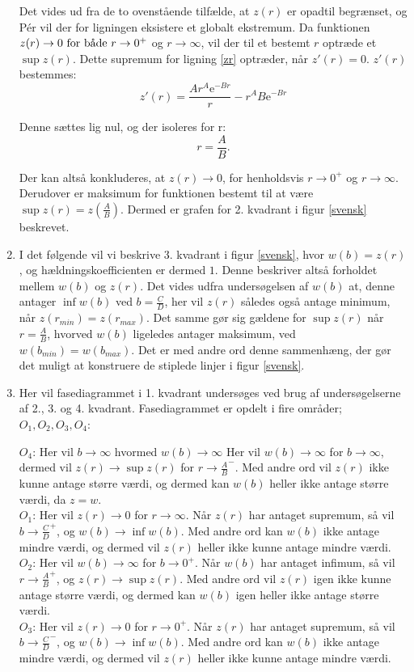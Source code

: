 \begin{enumerate}
Det vides ud fra de to ovenstående tilfælde, at $z(r)$ er opadtil begrænset, og Pér \citep[korollar 7.16, s. 121]{Analyse bog} vil der for ligningen eksistere et globalt ekstremum. Da funktionen $z(r) \to 0 \ \textnormal{for både} \ r \to 0^+$ og $r \to \infty$, vil der til et bestemt $r$ optræde et $\sup{z(r)}$. Dette supremum for ligning \eqref{zr} optræder, når $z'(r) = 0$. $z'(r)$ bestemmes:
$$z'(r)=\frac{Ar^A\mathrm{e}^{-Br}}{r}-r^AB\mathrm{e}^{-Br}$$

Denne sættes lig nul, og der isoleres for r:
$$r = \frac{A}{B}.$$

Der kan altså konkluderes, at $z(r) \to 0$, for henholdsvis $r \to 0^+$ og $r \to \infty$. Derudover er maksimum for funktionen bestemt til at være $\sup{z(r)}= z \left(\frac{A}{B} \right)$. Dermed er grafen for 2. kvadrant i figur \ref{svensk} beskrevet. \\

\item I det følgende vil vi beskrive 3. kvadrant i figur \ref{svensk}, hvor $w(b) = z(r)$, og hældningskoefficienten er dermed $1$. Denne beskriver altså forholdet mellem $w(b)$ og $z(r)$. Det vides udfra undersøgelsen af $w(b)$ at, denne antager $\inf{w(b)}$ ved $b=\frac{C}{D}$, her vil $z(r)$ således også antage minimum, når $z(r_{min}) = z(r_{max})$. Det samme gør sig gældene for $\sup{z(r)}$ når $r= \frac{A}{B}$, hvorved $w(b)$ ligeledes antager maksimum, ved $w(b_{min}) = w(b_{max})$. Det er med andre ord denne sammenhæng, der gør det muligt at konstruere de stiplede linjer i figur \ref{svensk}.

\item Her vil fasediagrammet i 1. kvadrant undersøges ved brug af undersøgelserne af 2., 3. og 4. kvadrant. Fasediagrammet er opdelt i fire områder; $O_1, O_2, O_3, O_4$:

$O_4$:
Her vil $b \to \infty$ hvormed $w(b) \to \infty$
Her vil $w(b) \to \infty$ for $b \to \infty$, dermed vil $z(r) \to \sup{z(r)}$ for $r \to \frac{A}{B}^-$. Med andre ord vil $z(r)$ ikke kunne antage større værdi, og dermed kan $w(b)$ heller ikke antage større værdi, da $z=w$.
\\

$O_1$:
Her vil $z(r) \to 0$ for $r \to \infty$. Når $z(r)$ har antaget supremum, så vil $b \to \frac{C}{D}^+$, og $w(b) \to \inf{w(b)}$. Med andre ord kan $w(b)$ ikke antage mindre værdi, og dermed vil $z(r)$ heller ikke kunne antage mindre værdi. 
\\

$O_2$:
Her vil $w(b) \to \infty$ for $b \to 0^+$. Når $w(b)$ har antaget infimum, så vil $r \to \frac{A}{B}^+$, og $z(r) \to \sup{z(r)}$. Med andre ord vil $z(r)$ igen ikke kunne antage større værdi, og dermed kan $w(b)$ igen heller ikke antage større værdi.
\\ 

$O_3$:
Her vil $z(r) \to 0$ for $r \to 0^+$. Når $z(r)$ har antaget supremum, så vil $b \to \frac{C}{D}^-$, og $w(b) \to \inf{w(b)}$. Med andre ord kan $w(b)$ ikke antage mindre værdi, og dermed vil $z(r)$ heller ikke kunne antage mindre værdi.
\end{enumerate}

